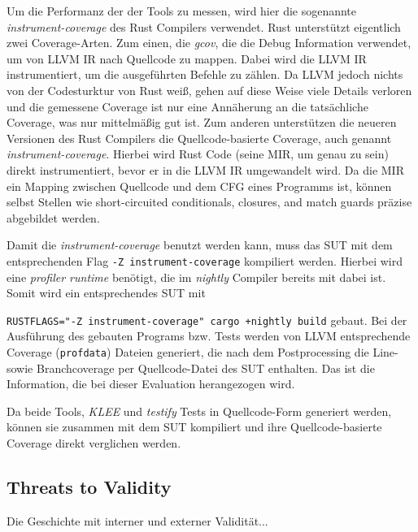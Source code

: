 \documentclass{article}
\begin{document}
Um die Performanz der der Tools zu messen, wird hier die sogenannte \textit{instrument-coverage} des Rust Compilers verwendet. Rust unterstützt eigentlich zwei Coverage-Arten. Zum einen, die \textit{gcov}, die die Debug Information verwendet, um von LLVM IR nach Quellcode zu mappen. Dabei wird die LLVM IR instrumentiert, um die ausgeführten Befehle zu zählen. Da LLVM jedoch nichts von der Codesturktur von Rust weiß, gehen auf diese Weise viele Details verloren und die gemessene Coverage ist nur eine Annäherung an die tatsächliche Coverage, was nur mittelmäßig gut ist. Zum anderen unterstützen die neueren Versionen des Rust Compilers die Quellcode-basierte Coverage, auch genannt \textit{instrument-coverage}. Hierbei wird Rust Code (seine MIR, um genau zu sein) direkt instrumentiert, bevor er in die LLVM IR umgewandelt wird. Da die MIR ein Mapping zwischen Quellcode und dem CFG eines Programms ist, können selbst Stellen wie short-circuited conditionals, closures, and match guards präzise abgebildet werden. 

Damit die \textit{instrument-coverage} benutzt werden kann, muss das SUT mit dem entsprechenden Flag \lstinline{-Z instrument-coverage} kompiliert werden. Hierbei wird eine \textit{profiler runtime} benötigt, die im \textit{nightly} Compiler bereits mit dabei ist. Somit wird ein entsprechendes SUT mit \raggedright\lstinline{RUSTFLAGS="-Z instrument-coverage" cargo +nightly build} gebaut. Bei der Ausführung des gebauten Programs bzw. Tests werden von LLVM entsprechende Coverage (\lstinline{profdata}) Dateien generiert,  die nach dem Postprocessing die Line- sowie Branchcoverage per Quellcode-Datei des SUT enthalten. Das ist die Information, die bei dieser Evaluation herangezogen wird. 

Da beide Tools, \textit{KLEE} und \textit{testify} Tests in Quellcode-Form generiert werden, können sie zusammen mit dem SUT kompiliert und ihre Quellcode-basierte Coverage direkt verglichen werden. 



\subsection{Threats to Validity}
Die Geschichte mit interner und externer Validität...
\end{document}

